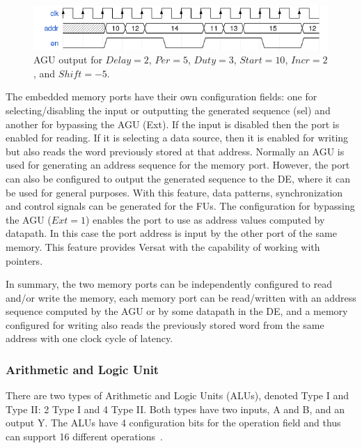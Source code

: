 \documentclass[journal]{IEEEtran}
\begin{document}
\begin{figure}[!h]
\centering
\includegraphics[width=\columnwidth]{addrgen.png}
\caption{AGU output for $Delay=2$, $Per=5$, $Duty=3$, $Start=10$, $Incr=2$, and $Shift=-5$.}
\label{fig_addrgen}
\end{figure}

The embedded memory ports have their own configuration fields: one for
selecting/disabling the input or outputting the generated sequence
(sel) and another for bypassing the AGU (Ext). If the input is
disabled then the port is enabled for reading. If it is selecting a
data source, then it is enabled for writing but also reads the word
previously stored at that address. Normally an AGU is used for
generating an address sequence for the memory port. However, the port
can also be configured to output the generated sequence to the DE,
where it can be used for general purposes. With this feature, data
patterns, synchronization and control signals can be generated for the
FUs. The configuration for bypassing the AGU ($Ext=1$) enables the
port to use as address values computed by datapath. In this case the
port address is input by the other port of the same memory. This
feature provides Versat with the capability of working with pointers.

In summary, the two memory ports can be independently configured to
read and/or write the memory, each memory port can be read/written with
an address sequence computed by the AGU or by some datapath in the
DE, and a memory configured for writing also reads the previously
stored word from the same address with one clock cycle of latency.

\subsubsection{Arithmetic and Logic Unit}
\label{subsection:arithmeticLogicUnit}

There are two types of Arithmetic and Logic Units (ALUs), denoted Type
I and Type II: 2 Type I and 4 Type II. Both types have two inputs, A
and B, and an output Y. The ALUs have 4 configuration bits for the
operation field and thus can support 16 different
operations~\cite{Lopes2017}.
\end{document}
